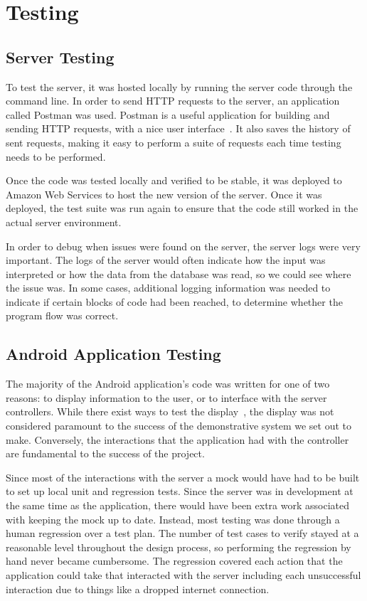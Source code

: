 \documentclass[12pt]{report}
\let\Oldsection\section
\renewcommand{\section}{\FloatBarrier\Oldsection}
\let\Oldsubsection\subsection
\renewcommand{\subsection}{\FloatBarrier\Oldsubsection}
\begin{document}
\section{Testing} \label{testing}

\subsection{Server Testing} \label{server-testing}

To test the server, it was hosted locally by running the server code through the command line.
In order to send HTTP requests to the server, an application called Postman was used. Postman
is a useful application for building and sending HTTP requests, with a nice user interface~\autocite{POSTMAN}.
It also saves the history of sent requests, making it easy to perform a suite of requests
each time testing needs to be performed.

Once the code was tested locally and verified to be stable, it was deployed to Amazon Web
Services to host the new version of the server. Once it was deployed, the test suite was
run again to ensure that the code still worked in the actual server environment.

In order to debug when issues were found on the server, the server logs were very important.
The logs of the server would often indicate how the input was interpreted or how the data
from the database was read, so we could see where the issue was. In some cases, additional
logging information was needed to indicate if certain blocks of code had been reached, to 
determine whether the program flow was correct.

\subsection{Android Application Testing} \label{android-application-testing}

The majority of the Android application's code was written for one of two reasons: to display information to the user,
or to interface with the server controllers. While there exist ways to test the display~\autocite{ANDROIDUITEST}, the
display was not considered paramount to the success of the demonstrative system we set out to make. Conversely, the
interactions that the application had with the controller are fundamental to the success of the project.

Since most of the interactions with the server a mock would have had to be built to set up local unit and regression
tests. Since the server was in development at the same time as the application, there would have been extra work
associated with keeping the mock up to date. Instead, most testing was done through a human regression over a test plan.
The number of test cases to verify stayed at a reasonable level throughout the design process, so performing the
regression by hand never became cumbersome. The regression covered each action that the application could take that
interacted with the server including each unsuccessful interaction due to things like a dropped internet connection.
\end{document}
